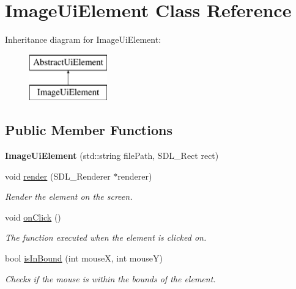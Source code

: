 \hypertarget{class_image_ui_element}{}\section{Image\+Ui\+Element Class Reference}
\label{class_image_ui_element}
Inheritance diagram for Image\+Ui\+Element\+:\begin{figure}[H]
\begin{center}
\leavevmode
\includegraphics[height=2.000000cm]{class_image_ui_element}
\end{center}
\end{figure}
\subsection*{Public Member Functions}
\begin{DoxyCompactItemize}
\item 
\mbox{\label{class_image_ui_element_aaa4540956ec81cef649694d1d45b28dd}} 
{\bfseries Image\+Ui\+Element} (std\+::string file\+Path, S\+D\+L\+\_\+\+Rect rect)
\item 
void \mbox{\hyperlink{class_image_ui_element_a422fc1d3b4c1451f656e7470e575577b}{render}} (S\+D\+L\+\_\+\+Renderer $\ast$renderer)
\begin{DoxyCompactList}\small\item\em Render the element on the screen. \end{DoxyCompactList}\item 
void \mbox{\hyperlink{class_image_ui_element_ab3c388de0807d86016a2ff43fd6d337e}{on\+Click}} ()
\begin{DoxyCompactList}\small\item\em The function executed when the element is clicked on. \end{DoxyCompactList}\item 
bool \mbox{\hyperlink{class_image_ui_element_a6d0f66cf68c5f035f5a9bfeaba3028f4}{is\+In\+Bound}} (int mouseX, int mouseY)
\begin{DoxyCompactList}\small\item\em Checks if the mouse is within the bounds of the element. \end{DoxyCompactList}\end{DoxyCompactItemize}
